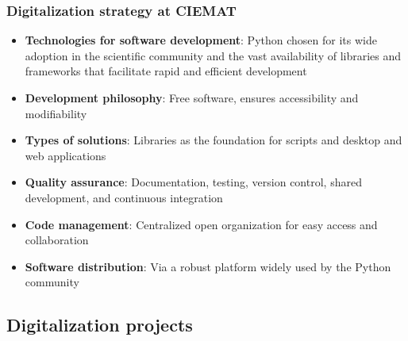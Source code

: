 \documentclass{beamer}
\begin{document}
    \begin{frame}
        \frametitle{Digitalization strategy at CIEMAT}
        \begin{itemize}
            \item \textbf{Technologies for software development}: Python chosen for its wide adoption in the scientific community and the vast availability of libraries and frameworks that facilitate rapid and efficient development
            \item \textbf{Development philosophy}: Free software, ensures accessibility and modifiability
            \item \textbf{Types of solutions}: Libraries as the foundation for scripts and desktop and web applications
            \item \textbf{Quality assurance}: Documentation, testing, version control, shared development, and continuous integration
            \item \textbf{Code management}: Centralized open organization for easy access and collaboration {\color{blue} \href{https://github.com/lmri-met}{\faExternalLink}}
            \item \textbf{Software distribution}: Via a robust platform widely used by the Python community
        \end{itemize}
    \end{frame}

    \subsection{Digitalization projects}
\end{document}
